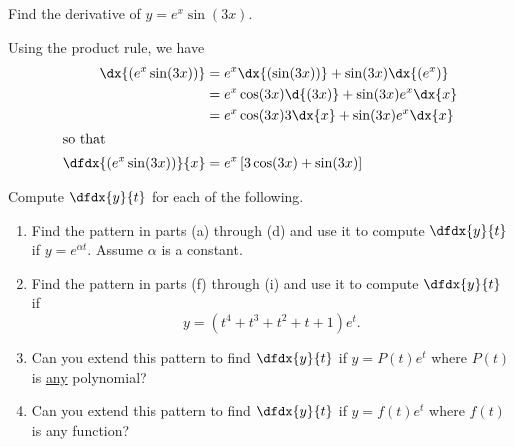 \begin{myexample}
  Find the derivative of $y=e^{x}\sin(3x).$

  Using the product rule, we have
  \begin{align*}
    \dx{\left(e^{x}\sin(3x)\right)}&=e^{x}\dx{(\sin(3x))}
                                       +\sin(3x)\dx{(e^{x})}\\
                                     &=e^{x}\cos(3x)\d{(3x)} +
                                       \sin(3x)e^{x}\dx{x}\\
                                     &=e^{x}\cos(3x)3\dx{x} +
                                       \sin(3x)e^{x}\dx{x}\\
    \intertext{so that}
    \dfdx{\left(e^{x}\sin(3x)\right)}{x}&=e^{x}\left[3\cos(3x) +
                                            \sin(3x)\right]\\ 
  \end{align*}

\end{myexample}

\begin{ProficiencyDrill}
  Compute $\dfdx{y}{t}$ for each of the following. 
  \begin{enumerate}[label={\bf{}(\alph*)}]
    \item Find the pattern in parts (a) through (d) and use it to
      compute $\dfdx{y}{t}$ if $y=e^{\alpha{}t}.$ Assume $\alpha{}$ is
      a constant.
      \item Find the pattern in parts (f) through (i) and use it to
        compute $\dfdx{y}{t}$ if $$y=(t^4+t^3+t^2+t+1)e^t.$$
      \item Can you extend this pattern to find $\dfdx{y}{t}$ if
        $y=P(t)e^t$ where $P(t)$ is \underline{any} polynomial? 
      \item Can you extend this pattern to find $\dfdx{y}{t}$ if
        $y=f(t)e^t$ where $f(t)$ is {any} function? 
    \end{enumerate}
  \end{ProficiencyDrill}

